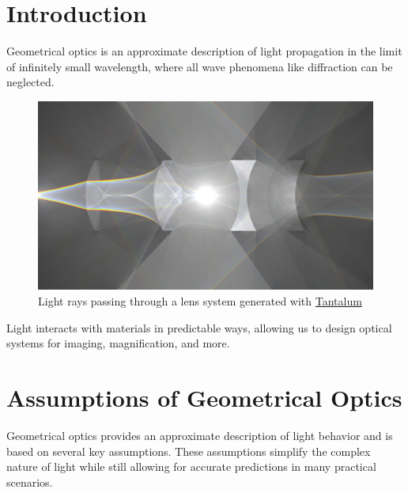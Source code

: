 \documentclass[
  a4paper,
]{book}
\begin{document}
\section{\texorpdfstring{\textbf{Introduction}}{Introduction}}\label{introduction}

Geometrical optics is an approximate description of light propagation in
the limit of infinitely small wavelength, where all wave phenomena like
diffraction can be neglected.

\begin{figure}

{\centering \includegraphics[width=1\linewidth,height=\textheight,keepaspectratio]{geometrical-optics/img/geometrical-optics-intro.png}

}

\caption{Light rays passing through a lens system generated with
\href{https://benedikt-bitterli.me/tantalum/tantalum.html}{Tantalum}}

\end{figure}%

Light interacts with materials in predictable ways, allowing us to
design optical systems for imaging, magnification, and more.

\section{Assumptions of Geometrical
Optics}\label{assumptions-of-geometrical-optics}

Geometrical optics provides an approximate description of light behavior
and is based on several key assumptions. These assumptions simplify the
complex nature of light while still allowing for accurate predictions in
many practical scenarios.
\end{document}
